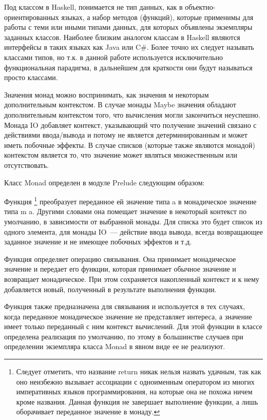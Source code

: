 Под классом в Haskell, понимается не тип данных, как в объектно-ориентированных языках, а набор методов (функций), которые применимы для работы с теми или иными типами данных, для которых объявлены экземпляры заданных классов. Наиболее близким аналогом классам в Haskell являются интерфейсы в таких языках как Java или C\#. Более точно их следует называть классами типов, но т.к. в данной работе используется исключительно функциональная парадигма, в дальнейшем для краткости они будут называться просто классами.

Значения монад можно воспринимать, как значения м некоторым дополнительным контекстом. В случае монады Maybe значения обладают дополнительным контекстом того, что вычисления могли закончиться неуспешно. Монада IO добавляет контекст, указывающий что получение значений связано с действиями ввода/вывода и потому не является детерминированным и может иметь побочные эффекты. В случае списков (которые также являются монадой) контекстом является то, что значение может являться множественным или отсутствовать.

Класс Monad определен в модуле Prelude следующим образом:



Функция \footnote{Следует отметить, что название return никак нельзя назвать удачным, так как оно неизбежно вызывает ассоциации с одноименным оператором из многих императивных языков программирования, на которые она не похожа ничем кроме названия. Данная функция не завершает выполнение функции, а лишь оборачивает переданное значение в монаду.} преобразует переданное ей значение типа a  в монадическое значение типа m a. Другими словами она помещает значение в некоторый контекст по умолчанию, в зависимости от выбранной монады. Для списка это будет список из одного элемента, для монады IO~--- действие ввода вывода, всегда возвращающее заданное значение и не имеющее побочных эффектов и т.д.

Функция \Code{$>>=$} определяет операцию связывания. Она принимает монадическое значение и передает его функции, которая принимает обычное значение и возвращает монадическое. При этом сохраняется накопленный контекст и к нему добавляется новый, полученный в результате выполнения функции.

Функция \Code{$>>$} также предназначена для связывания и используется в тех случаях, когда переданное монадическое значение не представляет интереса, а значение имеет только переданный с ним контекст вычислений. Для этой функции в классе определена реализация по умолчанию, по этому в большинстве случаев при определении экземпляра класса Monad в явном виде ее не реализуют.

